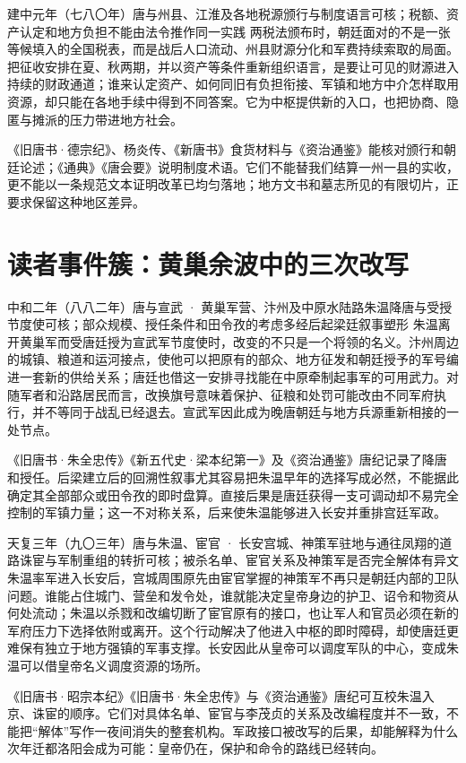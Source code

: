 \begin{event}{}{建中元年（七八〇年）}{唐与州县、江淮及各地税源}{颁行与制度语言可核；税额、资产认定和地方负担不能由法令推作同一实践}
两税法颁布时，朝廷面对的不是一张等候填入的全国税表，而是战后人口流动、州县财源分化和军费持续索取的局面。把征收安排在夏、秋两期，并以资产等条件重新组织语言，是要让可见的财源进入持续的财政通道；谁来认定资产、如何同旧有负担衔接、军镇和地方中介怎样取用资源，却只能在各地手续中得到不同答案。它为中枢提供新的入口，也把协商、隐匿与摊派的压力带进地方社会。

《旧唐书·德宗纪》、杨炎传、《新唐书》食货材料与《资治通鉴》能核对颁行和朝廷论述；《通典》《唐会要》说明制度术语。它们不能替我们结算一州一县的实收，更不能以一条规范文本证明改革已均匀落地；地方文书和墓志所见的有限切片，正要求保留这种地区差异。
\end{event}

\section{读者事件簇：黄巢余波中的三次改写}

\begin{event}{}{中和二年（八八二年）}{唐与宣武 · 黄巢军营、汴州及中原水陆路}{朱温降唐与受授节度使可核；部众规模、授任条件和田令孜的考虑多经后起梁廷叙事塑形}
朱温离开黄巢军而受唐廷授为宣武军节度使时，改变的不只是一个将领的名义。汴州周边的城镇、粮道和运河接点，使他可以把原有的部众、地方征发和朝廷授予的军号编进一套新的供给关系；唐廷也借这一安排寻找能在中原牵制起事军的可用武力。对随军者和沿路居民而言，改换旗号意味着保护、征粮和处罚可能改由不同军府执行，并不等同于战乱已经退去。宣武军因此成为晚唐朝廷与地方兵源重新相接的一处节点。

《旧唐书·朱全忠传》《新五代史·梁本纪第一》及《资治通鉴》唐纪记录了降唐和授任。后梁建立后的回溯性叙事尤其容易把朱温早年的选择写成必然，不能据此确定其全部部众或田令孜的即时盘算。直接后果是唐廷获得一支可调动却不易完全控制的军镇力量；这一不对称关系，后来使朱温能够进入长安并重排宫廷军政。
\end{event}

\begin{event}{}{天复三年（九〇三年）}{唐与朱温、宦官 · 长安宫城、神策军驻地与通往凤翔的道路}{诛宦与军制重组的转折可核；被杀名单、宦官关系及神策军是否完全解体有异文}
朱温率军进入长安后，宫城周围原先由宦官掌握的神策军不再只是朝廷内部的卫队问题。谁能占住城门、营垒和发令处，谁就能决定皇帝身边的护卫、诏令和物资从何处流动；朱温以杀戮和改编切断了宦官原有的接口，也让军人和官员必须在新的军府压力下选择依附或离开。这个行动解决了他进入中枢的即时障碍，却使唐廷更难保有独立于地方强镇的军事支撑。长安因此从皇帝可以调度军队的中心，变成朱温可以借皇帝名义调度资源的场所。

《旧唐书·昭宗本纪》《旧唐书·朱全忠传》与《资治通鉴》唐纪可互校朱温入京、诛宦的顺序。它们对具体名单、宦官与李茂贞的关系及改编程度并不一致，不能把“解体”写作一夜间消失的整套机构。军政接口被改写的后果，却能解释为什么次年迁都洛阳会成为可能：皇帝仍在，保护和命令的路线已经转向。
\end{event}

